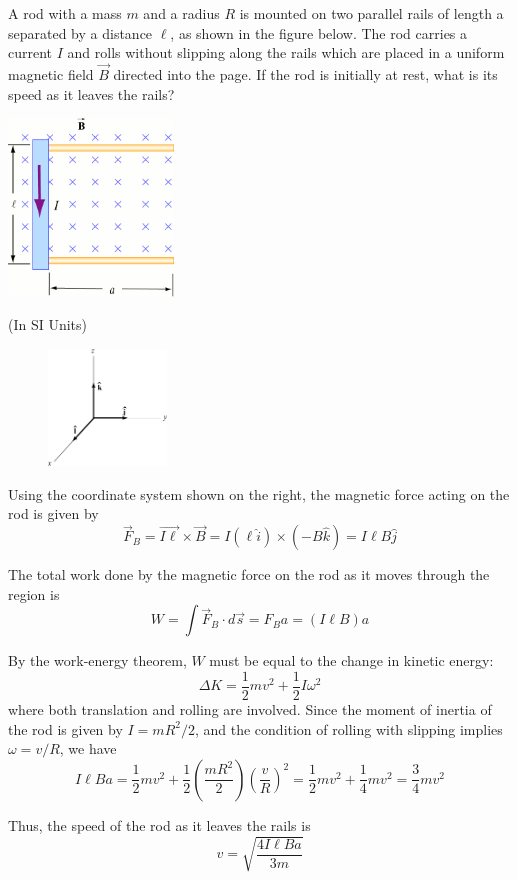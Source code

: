 \documentclass{esg8022pset}
\begin{document}
\begin{problem}{}
  A rod with a mass $m$ and a radius $R$ is mounted on two parallel rails of length a separated by a distance $\ell$, as shown in the figure below. The rod carries a current $I$ and rolls without slipping along the rails which are placed in a uniform magnetic field $\vec B$ directed into the page. If the rod is initially at rest, what is its speed as it leaves the rails?
  \begin{center}\includegraphics[width=0.33\textwidth]{ps07_03}\end{center}
\end{problem}
\begin{solution}
  (In SI Units)
  
  \begin{figure}
    \centering
    \includegraphics[width=0.28\textwidth]{ps07_sol_03_1}
  \end{figure}
  Using the coordinate system shown on the right, the magnetic force acting on the rod is given by
  $$\vec F_B = \vec{I \ell}\times \vec B = I (\ell \hat i) \times (-B\hat k) = I\ell B \hat j$$
  
  The total work done by the magnetic force on the rod as it moves through the region is
  $$W = \int \vec F_B\cdot d\vec s = F_B a = (I\ell B)a$$
  
  By the work-energy theorem, $W$ must be equal to the change in kinetic energy:
  $$\Delta K = \frac12 m v^2 + \frac12 I \omega^2$$
  where both translation and rolling are involved. Since the moment of inertia of the rod is given by $I = mR^2 / 2$, and the condition of rolling with slipping implies $\omega = v / R$, we have
  $$I \ell B a = \frac12 m v^2 + \frac12 \left(\frac{m R^2}{2}\right)\left(\frac{v}{R}\right)^2 = \frac12 m v^2 + \frac14 m v^2 = \frac34 m v^2$$

  Thus, the speed of the rod as it leaves the rails is
  $$v = \sqrt{\frac{4I\ell B a}{3m}}$$
\end{solution}
\end{document}
